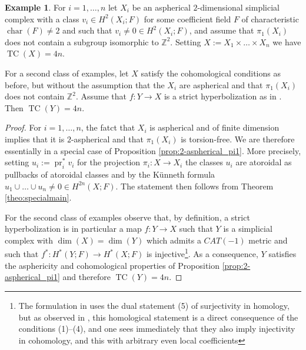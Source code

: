 \documentclass[a4paper,twoside]{article}
\theoremstyle{plain}
\theoremstyle{definition}
\newtheorem{example}[theorem]{Example}
\theoremstyle{remark}
\newcommand{\integers}{\mathbb{Z}}
\DeclareMathOperator{\pr}{pr}
\DeclareMathOperator{\characteristic}{char}
\DeclareMathOperator{\TC}{TC}
\begin{document}
\begin{example}
  For $i=1,\dots,n$ let $X_i$ be an aspherical $2$-dimensional simplicial complex with a
  class $v_i\in H^2(X_i;F)$ for some coefficient field $F$ of characteristic
  $\characteristic(F)\ne 2$ and such
  that $v_i\ne 0\in H^{2}(X_i;F)$, and assume that $\pi_1(X_i)$ does not
  contain a subgroup isomorphic to $\integers^2$.
  Setting $X:=X_1\times\dots\times X_n$ we have $\TC(X)=4n$.

  \smallskip
 For a second class of examples, let $X$ satisfy the cohomological conditions
 as before, but without the assumption that the
 $X_i$ are aspherical and that $\pi_1(X_i)$ does not contain
 $\integers^2$. Assume that $f\colon Y\to X$ is a 
 strict  hyperbolization as in \cite{CharneyDavis}. Then $\TC(Y)=4n$.
\end{example}
\begin{proof}
  For $i=1,\dots,n$, the fatct that $X_i$ is aspherical and of finite
  dimension implies that it is
  $2$-aspherical and that $\pi_1(X_i)$ is torsion-free. We are therefore essentially in a 
  special case of Proposition \ref{prop:2-aspherical_pi1}. More precisely,
  setting $u_i:=\pr_i^*v_i$ for the projection $\pi_i\colon X\to X_i$ the
  classes $u_i$ are atoroidal as pullbacks of atoroidal classes and by the
  K\"unneth formula $u_1\cup\dots\cup u_n\ne 0 \in H^{2n}(X;F)$. The statement
  then follows from Theorem \ref{theo:specialmain}.

  For the second class of examples observe that, by definition, a strict
  hyperbolization is in particular a map $f\colon Y\to 
  X$ such that $Y$ is a simplicial complex with $\dim(X)=\dim(Y)$ which admits
  a $CAT(-1)$ metric and such that $f^*\colon H^*(Y;F)\to H^*(X;F)$ is
  injective\footnote{The formulation in \cite[Section 2]{CharneyDavis} uses
    the dual statement (5) of surjectivity in homology, but as observed in
    \cite[Section 2]{CharneyDavis}, this homological statement is a direct
    consequence of the conditions (1)--(4), and one sees immediately that they
    also imply injectivity in cohomology, and this with arbitrary even local
    coefficients}. As a consequence, $Y$ satisfies the asphericity and cohomological
  properties of Proposition \ref{prop:2-aspherical_pi1} and therefore $\TC(Y)=4n$.
\end{proof}
\end{document}
